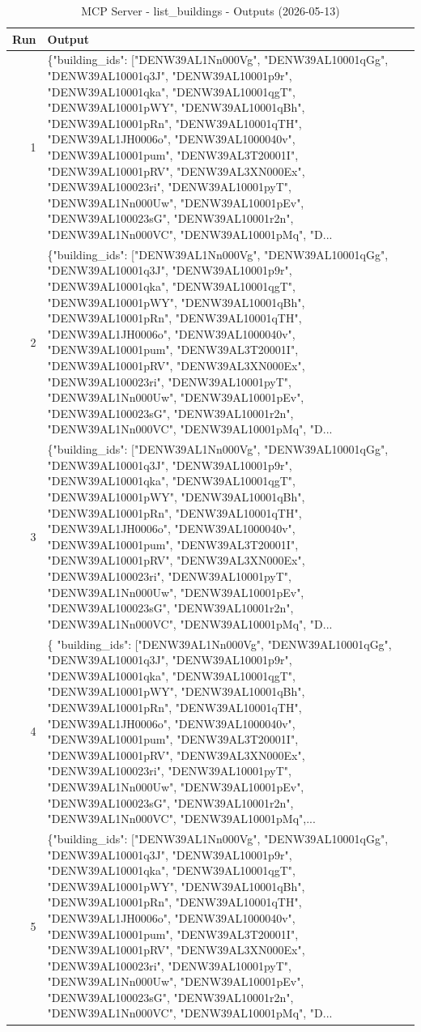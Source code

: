 \documentclass[a4paper,11pt]{article}
\begin{document}
\begin{table}[ht]
\centering
\scriptsize
\caption{MCP Server - list\_buildings - Outputs (2026-05-13)}
\label{tab:mcp\_list\_buildings\_outputs\_2026-05-13}
\begin{tabular}{r p{12cm}}
\hline
Run & Output \\
\hline
1 & \{"building\_ids": ["DENW39AL1Nn000Vg", "DENW39AL10001qGg", "DENW39AL10001q3J", "DENW39AL10001p9r", "DENW39AL10001qka", "DENW39AL10001qgT", "DENW39AL10001pWY", "DENW39AL10001qBh", "DENW39AL10001pRn", "DENW39AL10001qTH", "DENW39AL1JH0006o", "DENW39AL1000040v", "DENW39AL10001pum", "DENW39AL3T20001I", "DENW39AL10001pRV", "DENW39AL3XN000Ex", "DENW39AL100023ri", "DENW39AL10001pyT", "DENW39AL1Nn000Uw", "DENW39AL10001pEv", "DENW39AL100023sG", "DENW39AL10001r2n", "DENW39AL1Nn000VC", "DENW39AL10001pMq", "D... \\
2 & \{"building\_ids": ["DENW39AL1Nn000Vg", "DENW39AL10001qGg", "DENW39AL10001q3J", "DENW39AL10001p9r", "DENW39AL10001qka", "DENW39AL10001qgT", "DENW39AL10001pWY", "DENW39AL10001qBh", "DENW39AL10001pRn", "DENW39AL10001qTH", "DENW39AL1JH0006o", "DENW39AL1000040v", "DENW39AL10001pum", "DENW39AL3T20001I", "DENW39AL10001pRV", "DENW39AL3XN000Ex", "DENW39AL100023ri", "DENW39AL10001pyT", "DENW39AL1Nn000Uw", "DENW39AL10001pEv", "DENW39AL100023sG", "DENW39AL10001r2n", "DENW39AL1Nn000VC", "DENW39AL10001pMq", "D... \\
3 & \{"building\_ids": ["DENW39AL1Nn000Vg", "DENW39AL10001qGg", "DENW39AL10001q3J", "DENW39AL10001p9r", "DENW39AL10001qka", "DENW39AL10001qgT", "DENW39AL10001pWY", "DENW39AL10001qBh", "DENW39AL10001pRn", "DENW39AL10001qTH", "DENW39AL1JH0006o", "DENW39AL1000040v", "DENW39AL10001pum", "DENW39AL3T20001I", "DENW39AL10001pRV", "DENW39AL3XN000Ex", "DENW39AL100023ri", "DENW39AL10001pyT", "DENW39AL1Nn000Uw", "DENW39AL10001pEv", "DENW39AL100023sG", "DENW39AL10001r2n", "DENW39AL1Nn000VC", "DENW39AL10001pMq", "D... \\
4 & \{
  "building\_ids": ["DENW39AL1Nn000Vg", "DENW39AL10001qGg", "DENW39AL10001q3J", "DENW39AL10001p9r", "DENW39AL10001qka", "DENW39AL10001qgT", "DENW39AL10001pWY", "DENW39AL10001qBh", "DENW39AL10001pRn", "DENW39AL10001qTH", "DENW39AL1JH0006o", "DENW39AL1000040v", "DENW39AL10001pum", "DENW39AL3T20001I", "DENW39AL10001pRV", "DENW39AL3XN000Ex", "DENW39AL100023ri", "DENW39AL10001pyT", "DENW39AL1Nn000Uw", "DENW39AL10001pEv", "DENW39AL100023sG", "DENW39AL10001r2n", "DENW39AL1Nn000VC", "DENW39AL10001pMq",... \\
5 & \{"building\_ids": ["DENW39AL1Nn000Vg", "DENW39AL10001qGg", "DENW39AL10001q3J", "DENW39AL10001p9r", "DENW39AL10001qka", "DENW39AL10001qgT", "DENW39AL10001pWY", "DENW39AL10001qBh", "DENW39AL10001pRn", "DENW39AL10001qTH", "DENW39AL1JH0006o", "DENW39AL1000040v", "DENW39AL10001pum", "DENW39AL3T20001I", "DENW39AL10001pRV", "DENW39AL3XN000Ex", "DENW39AL100023ri", "DENW39AL10001pyT", "DENW39AL1Nn000Uw", "DENW39AL10001pEv", "DENW39AL100023sG", "DENW39AL10001r2n", "DENW39AL1Nn000VC", "DENW39AL10001pMq", "D... \\

\end{tabular}
\end{table}
\end{document}
